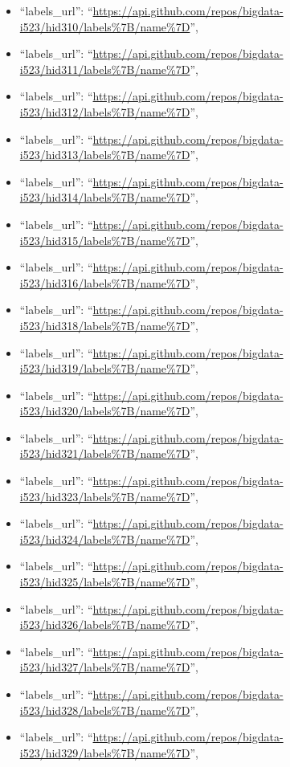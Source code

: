 \begin{itemize}
\item
  ``labels\_url'':
  ``\url{https://api.github.com/repos/bigdata-i523/hid310/labels\%7B/name\%7D}'',
\item
  ``labels\_url'':
  ``\url{https://api.github.com/repos/bigdata-i523/hid311/labels\%7B/name\%7D}'',
\item
  ``labels\_url'':
  ``\url{https://api.github.com/repos/bigdata-i523/hid312/labels\%7B/name\%7D}'',
\item
  ``labels\_url'':
  ``\url{https://api.github.com/repos/bigdata-i523/hid313/labels\%7B/name\%7D}'',
\item
  ``labels\_url'':
  ``\url{https://api.github.com/repos/bigdata-i523/hid314/labels\%7B/name\%7D}'',
\item
  ``labels\_url'':
  ``\url{https://api.github.com/repos/bigdata-i523/hid315/labels\%7B/name\%7D}'',
\item
  ``labels\_url'':
  ``\url{https://api.github.com/repos/bigdata-i523/hid316/labels\%7B/name\%7D}'',
\item
  ``labels\_url'':
  ``\url{https://api.github.com/repos/bigdata-i523/hid318/labels\%7B/name\%7D}'',
\item
  ``labels\_url'':
  ``\url{https://api.github.com/repos/bigdata-i523/hid319/labels\%7B/name\%7D}'',
\item
  ``labels\_url'':
  ``\url{https://api.github.com/repos/bigdata-i523/hid320/labels\%7B/name\%7D}'',
\item
  ``labels\_url'':
  ``\url{https://api.github.com/repos/bigdata-i523/hid321/labels\%7B/name\%7D}'',
\item
  ``labels\_url'':
  ``\url{https://api.github.com/repos/bigdata-i523/hid323/labels\%7B/name\%7D}'',
\item
  ``labels\_url'':
  ``\url{https://api.github.com/repos/bigdata-i523/hid324/labels\%7B/name\%7D}'',
\item
  ``labels\_url'':
  ``\url{https://api.github.com/repos/bigdata-i523/hid325/labels\%7B/name\%7D}'',
\item
  ``labels\_url'':
  ``\url{https://api.github.com/repos/bigdata-i523/hid326/labels\%7B/name\%7D}'',
\item
  ``labels\_url'':
  ``\url{https://api.github.com/repos/bigdata-i523/hid327/labels\%7B/name\%7D}'',
\item
  ``labels\_url'':
  ``\url{https://api.github.com/repos/bigdata-i523/hid328/labels\%7B/name\%7D}'',
\item
  ``labels\_url'':
  ``\url{https://api.github.com/repos/bigdata-i523/hid329/labels\%7B/name\%7D}'',

\end{itemize}

